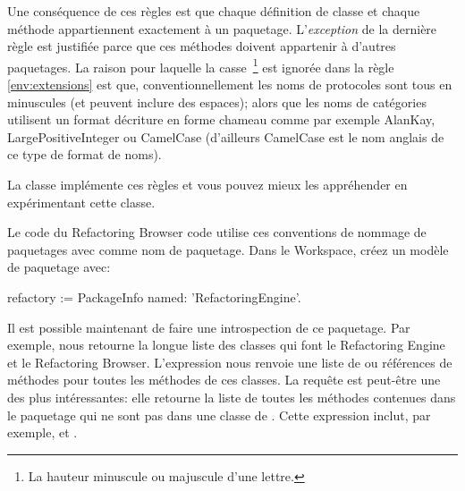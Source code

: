 \documentclass[a4paper,10pt,twoside]{book}
\begin{document}
\noindent
Une cons\'equence de ces r\`egles est que chaque d\'efinition de classe et chaque m\'ethode appartiennent exactement \`a un paquetage. 
L'\emph{exception} de la derni\`ere r\`egle est justifi\'ee parce que
ces m\'ethodes doivent appartenir \`a d'autres paquetages.
La raison pour laquelle la casse~\footnote{La hauteur minuscule ou majuscule d'une lettre.} est ignor\'ee dans la r\`egle 
\ref{env:extensions} 
est que, conventionnellement les noms de protocoles sont tous en minuscules (et peuvent inclure des espaces); alors que les noms de cat\'egories utilisent un format d\'ecriture en forme chameau comme par exemple AlanKay, LargePositiveInteger ou CamelCase (d'ailleurs CamelCase est le nom anglais de ce type de format de noms).

La classe  impl\'emente ces r\`egles et vous pouvez mieux les appr\'ehender en exp\'erimentant cette classe.

Le code du Refactoring Browser code utilise ces conventions de nommage de
paquetages avec  comme nom de paquetage. 
Dans le Workspace, cr\'eez un mod\`ele de paquetage avec:


\begin{code}{}
refactory := PackageInfo named: 'RefactoringEngine'.
\end{code}

Il est possible maintenant de faire une introspection de ce paquetage.
Par exemple,  nous retourne la longue liste
des classes qui font le Refactoring Engine et le Refactoring Browser.  
L'expression 
nous renvoie une liste de \mbox{} ou r\'ef\'erences de m\'ethodes
pour toutes les m\'ethodes de ces classes.
La requ\^ete  est peut-\^etre une des plus
int\'eressantes: elle retourne la liste de toutes les m\'ethodes contenues
dans le paquetage  qui ne sont pas dans une classe de . 
Cette expression inclut, par exemple,  et .
\end{document}
